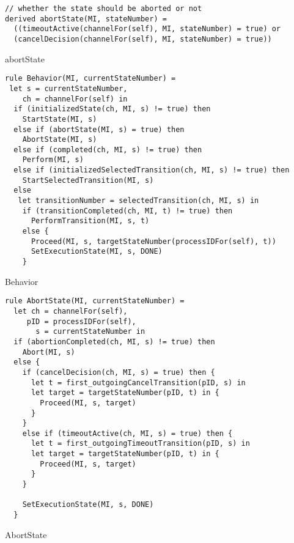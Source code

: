 \begin{listing}[H]
\begin{verbatim}
// whether the state should be aborted or not
derived abortState(MI, stateNumber) =
  ((timeoutActive(channelFor(self), MI, stateNumber) = true) or
  (cancelDecision(channelFor(self), MI, stateNumber) = true))
\end{verbatim}
\caption{abortState}
\label{lst:asm:abortState}
\end{listing}




\begin{listing}[H]
\begin{verbatim}
rule Behavior(MI, currentStateNumber) =
 let s = currentStateNumber,
    ch = channelFor(self) in
  if (initializedState(ch, MI, s) != true) then
    StartState(MI, s)
  else if (abortState(MI, s) = true) then
    AbortState(MI, s)
  else if (completed(ch, MI, s) != true) then
    Perform(MI, s)
  else if (initializedSelectedTransition(ch, MI, s) != true) then
    StartSelectedTransition(MI, s)
  else
   let transitionNumber = selectedTransition(ch, MI, s) in
    if (transitionCompleted(ch, MI, t) != true) then
      PerformTransition(MI, s, t)
    else {
      Proceed(MI, s, targetStateNumber(processIDFor(self), t))
      SetExecutionState(MI, s, DONE)
    }
\end{verbatim}
\caption{Behavior}
\label{lst:asm:Behavior}
\end{listing}




\begin{listing}[H]
\begin{verbatim}
rule AbortState(MI, currentStateNumber) =
  let ch = channelFor(self),
     pID = processIDFor(self),
       s = currentStateNumber in
  if (abortionCompleted(ch, MI, s) != true) then
    Abort(MI, s)
  else {
    if (cancelDecision(ch, MI, s) = true) then {
      let t = first_outgoingCancelTransition(pID, s) in
      let target = targetStateNumber(pID, t) in {
        Proceed(MI, s, target)
      }
    }
    else if (timeoutActive(ch, MI, s) = true) then {
      let t = first_outgoingTimeoutTransition(pID, s) in
      let target = targetStateNumber(pID, t) in {
        Proceed(MI, s, target)
      }
    }

    SetExecutionState(MI, s, DONE)
  }
\end{verbatim}
\caption{AbortState}
\label{lst:asm:AbortState}
\end{listing}




